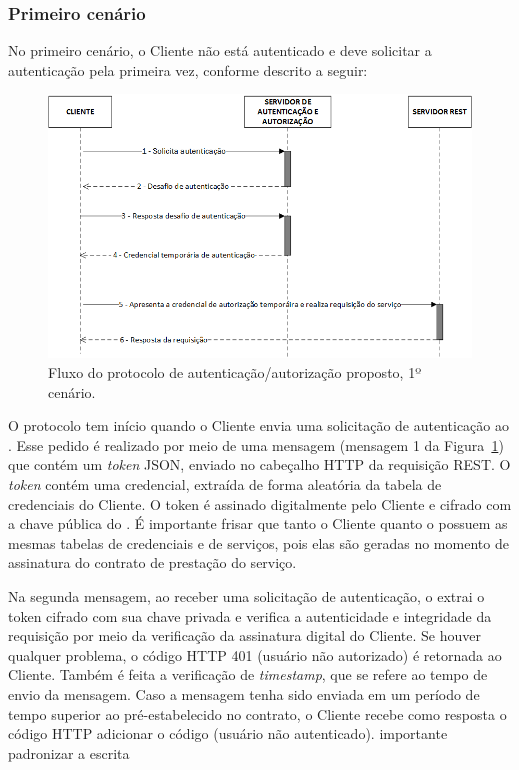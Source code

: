 \subsubsection{Primeiro cenário}

No primeiro cenário, o Cliente não está autenticado e deve solicitar a autenticação pela primeira vez, conforme descrito a seguir:

\begin{figure}[!htb]
    \centering
    \includegraphics[width=1.0\textwidth]{fluxo_autenticacao.png}
    \caption{Fluxo do protocolo de autenticação/autorização proposto, 1º cenário.}
    \label{fig:protocoloseguro}
\end{figure}


O protocolo tem início quando o Cliente envia uma solicitação de autenticação ao \servidorAA.
Esse pedido é realizado por meio de uma mensagem (mensagem 1 da Figura~\ref{fig:protocoloseguro})
que contém um \emph{token} JSON, enviado no cabeçalho HTTP da requisição REST. O \emph{token} contém uma
credencial, extraída de forma aleatória da tabela de credenciais do Cliente. O token é assinado digitalmente pelo Cliente
e cifrado com a chave pública do \servidorAA. É importante frisar que tanto o Cliente quanto o
\servidorAA{} possuem as mesmas tabelas de credenciais e de serviços, pois elas são
geradas no momento de assinatura do contrato de prestação do serviço.

Na segunda mensagem, ao receber uma solicitação de autenticação, o \servidorAA{} extrai o
token cifrado com sua chave privada e verifica a autenticidade e integridade da requisição por meio da verificação da assinatura digital do Cliente.
Se houver qualquer problema, o c\'{o}digo HTTP 401 (usuário não autorizado) é retornada ao Cliente.
Tamb\'{e}m \'{e} feita a verifica\c c\~{a}o de \emph{timestamp}, que se refere ao tempo de envio da mensagem. Caso a mensagem tenha
sido enviada em um período de tempo superior ao pré-estabelecido no contrato, o Cliente recebe
como resposta o c\'{o}digo HTTP {\color{red}adicionar o c\'{o}digo} (usuário não autenticado). {\color{red}importante padronizar a escrita}

